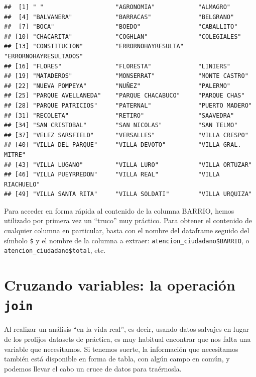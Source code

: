 \documentclass[]{book}
\begin{document}
\begin{verbatim}
##  [1] " "                    "AGRONOMIA"            "ALMAGRO"             
##  [4] "BALVANERA"            "BARRACAS"             "BELGRANO"            
##  [7] "BOCA"                 "BOEDO"                "CABALLITO"           
## [10] "CHACARITA"            "COGHLAN"              "COLEGIALES"          
## [13] "CONSTITUCION"         "ERRORNOHAYRESULTA"    "ERRORNOHAYRESULTADOS"
## [16] "FLORES"               "FLORESTA"             "LINIERS"             
## [19] "MATADEROS"            "MONSERRAT"            "MONTE CASTRO"        
## [22] "NUEVA POMPEYA"        "NUÑEZ"                "PALERMO"             
## [25] "PARQUE AVELLANEDA"    "PARQUE CHACABUCO"     "PARQUE CHAS"         
## [28] "PARQUE PATRICIOS"     "PATERNAL"             "PUERTO MADERO"       
## [31] "RECOLETA"             "RETIRO"               "SAAVEDRA"            
## [34] "SAN CRISTOBAL"        "SAN NICOLAS"          "SAN TELMO"           
## [37] "VELEZ SARSFIELD"      "VERSALLES"            "VILLA CRESPO"        
## [40] "VILLA DEL PARQUE"     "VILLA DEVOTO"         "VILLA GRAL. MITRE"   
## [43] "VILLA LUGANO"         "VILLA LURO"           "VILLA ORTUZAR"       
## [46] "VILLA PUEYRREDON"     "VILLA REAL"           "VILLA RIACHUELO"     
## [49] "VILLA SANTA RITA"     "VILLA SOLDATI"        "VILLA URQUIZA"
\end{verbatim}

Para acceder en forma rápida al contenido de la columna BARRIO, hemos
utilizado por primera vez un ``truco'' muy práctico. Para obtener el
contenido de cualquier columna en particular, basta con el nombre del
dataframe seguido del símbolo \texttt{\$} y el nombre de la columna a
extraer: \texttt{atencion\_ciudadano\$BARRIO}, o
\texttt{atencion\_ciudadano\$total}, etc.

\section{\texorpdfstring{Cruzando variables: la operación
\texttt{join}}{Cruzando variables: la operación join}}\label{cruzando-variables-la-operacion-join}

Al realizar un análisis ``en la vida real'', es decir, usando datos
salvajes en lugar de los prolijos datasets de práctica, es muy habitual
encontrar que nos falta una variable que necesitamos. Si tenemos suerte,
la información que necesitamos también está disponible en forma de
tabla, con algún campo en común, y podemos llevar el cabo un cruce de
datos para traérnosla.
\end{document}
